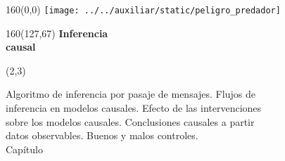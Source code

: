 \documentclass[shownotes,aspectratio=169]{beamer}
\newcounter{capitulo}
\newcommand{\unidad}{\thecapitulo \stepcounter{capitulo}}
\begin{document}
%
%
%
%
%
%
%
%
%
%
%


\begin{frame}

\begin{textblock}{160}(0,0)
\texttt{[image: ../../auxiliar/static/peligro\_predador]}
\end{textblock}

\begin{textblock}{160}(127,67)
\LARGE \textcolor{black!5}{\fontsize{22}{0}\selectfont \textbf{Inferencia  \\[-0.1cm] \hspace{0.5cm} causal}}
\end{textblock}

\begin{textblock}{55}(2,3)
\begin{turn}{0}
\parbox{15cm}{\small
\textcolor{black!95}{Algoritmo de inferencia por pasaje de mensajes. Flujos de}\\
\textcolor{black!95}{inferencia en modelos causales. Efecto de las intervenciones}\\
\textcolor{black!95}{sobre los modelos causales. Conclusiones causales a partir} \\
\textcolor{black!95}{datos observables. Buenos y malos controles.} \\
\normalsize\textcolor{black!95}{Capítulo \unidad} \\
}
\end{turn}
\end{textblock}


\end{frame}
\end{document}
